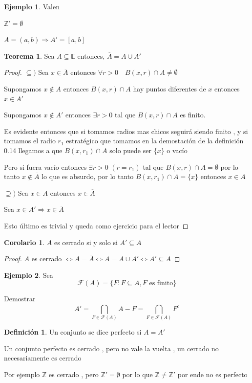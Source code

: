 \documentclass[12pt]{article}
\newcommand{\Z}{\mathbb{Z}}
\newcommand{\E}{\mathbb{E}}
\newcommand{\Ra}{\Rightarrow}
\newcommand{\ol}{\overline}
\theoremstyle{definition}
\newtheorem{definition}{Definición}[section]
\newtheorem{theorem}{Teorema}
\newtheorem{corollary}{Corolario}[theorem]
\newtheorem{ex}{Ejemplo}
\begin{document}
\begin{ex} Valen

  $\Z ' = \emptyset$

  $A = (a,b) \Ra A' = [a,b] $
\end{ex}

\begin{theorem}
  Sea $A \subseteq \E$ entonces, $\ol A = A \cup A'$

  \begin{proof}
  $\subseteq ) $ Sea $x \in \ol A$ entonces $\forall r>0 \quad B(x,r) \cap A \neq \emptyset$

Supongamos $x \notin A$ entonces $B(x,r) \cap A$ hay puntos diferentes de $x$ entonces $x \in A'$

Supongamos $x \notin A' $ entonces $\exists r > 0$ tal que $B(x,r)  \cap A $ es finito.

Es evidente entonces que si tomamos radios mas chicos seguirá siendo finito , y si tomamos el radio $r_{1}$ estratégico que tomamos en la demostación de la definición 0.14 llegamos a que $B(x,r_{1}) \cap A $ solo puede ser $\{x\}$ o vacío

Pero si fuera vacío entonces $\exists r > 0$ $ (r = r_{1})$ tal que $B(x,r) \cap A = \emptyset$ por lo tanto $x \notin \ol A$ lo que es absurdo, por lo tanto $B(x,r_{1}) \cap  A = \{x\}$ entonces $x \in A$

$\supseteq )$ Sea $x \in A$ entonces $x \in \ol A$

Sea $x \in A' \Ra x \in \ol A$ 

Esto último es trivial y queda como ejercicio para el lector
  \end{proof}
\end{theorem}

\begin{corollary}
$A$ es cerrado si y solo si $A' \subseteq A$

\begin{proof}
  $A$ es cerrado $ \iff A = \ol A \iff A = A \cup A' \iff A' \subseteq A$
\end{proof}
\end{corollary}

\begin{ex}
  Sea 
$$ \mathcal{F}(A) = \{F : F \subseteq A, F \text{ es finito}\} $$

Demostrar $$ A' = \bigcap_{F \in \mathcal{F}(A)} \ol{A - F} = \bigcap_{F \in \mathcal{F}(A)} \ol{F^c}$$
\end{ex}

\begin{definition}
  Un conjunto se dice perfecto si $A = A'$

  Un conjunto perfecto es cerrado , pero no vale la vuelta , un cerrado no necesariamente es cerrado

  Por ejemplo $\Z$ es cerrado , pero $\Z ' = \emptyset$ por lo que $\Z \neq \Z '$ por ende no es perfecto
\end{definition}
\end{document}
